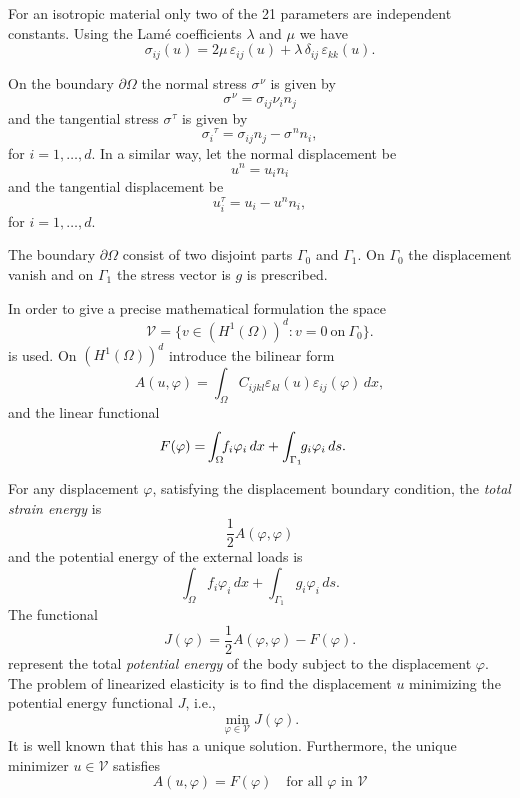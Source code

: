 \documentclass[12pt,a4paper]{article}
\numberwithin{equation}{section}
\numberwithin{table}{section}
\numberwithin{figure}{section}
\newcommand{\dOmega}{{\partial\Omega}}
\newcommand{\ton}{\ \text{on}\ }
\newcommand{\HenO}{H^1(\Omega)}
\newcommand{\V}{\ensuremath{\mathcal{V}}}
\newcommand{\intO}{\int_\Omega\!\!}
\newcommand{\intG}[1][0]{\int_{\Gamma_{#1}}\!\!}
\renewcommand{\epsilon}{\varepsilon}
\renewcommand{\phi}{\varphi}
\newcommand{\strain}[1][]{\ensuremath{\epsilon_{#1}}}
\newcommand{\epsij}{\strain[ij]}
\newcommand{\epskk}{\strain[kk]}
\newcommand{\epskl}{\strain[kl]}
\newcommand{\stress}[1][]{\ensuremath{\sigma_{#1}}}
\newcommand{\sigij}{\stress[ij]}
\newcommand{\dx}{{\,dx}}
\newcommand{\ds}{{\,ds}}
\begin{document}
For an isotropic material only two of the 21 parameters are independent constants.
Using the Lam\'{e} coefficients $\lambda$ and $\mu$ we have
\begin{equation}
  \label{eq:isotropStressStrain}
  \sigij(u) = 2\mu\, \epsij(u) 
  + \lambda\, \delta_{ij}\, \epskk(u).
\end{equation}

On the boundary $\dOmega$ the normal stress $\stress^\nu$ is given by
\[ \stress^\nu = \sigij \nu_in_j \]
and the tangential stress $\stress^\tau$ is given by
\[ \stress[i]^\tau = \sigij n_j - \stress^n n_i, \]
for $i=1,\ldots,d$.  In a similar way, let the normal displacement be
\[ u^n = u_i n_i \]
and the tangential displacement be
\[ u^\tau_i = u_i - u^n n_i, \]
for $i=1,\ldots,d$.

The boundary $\dOmega$ consist of two disjoint parts $\Gamma_0$ and $\Gamma_1$.  On $\Gamma_0$ the displacement vanish and on $\Gamma_1$ the stress vector is $g$ is prescribed.

In order to give a precise mathematical formulation the space
\begin{equation}
\V = \{ v\in (\HenO)^d \colon v = 0 \ton\Gamma_0\}.
\end{equation}
is used.  On $(\HenO)^d$ introduce the bilinear form
\begin{equation}
\label{eq:Aelasticity}
A(u,\phi) = \intO C_{ijkl}\epskl(u)\epsij(\phi)\dx,
\end{equation}
and the linear functional
\begin{align}
\label{eq:Felasticity}
F(\phi) = & \intO f_i\phi_i\dx
        + \intG[1] g_i \phi_i\ds. \notag
\end{align}

For any displacement $\phi$, satisfying the displacement boundary
condition, the \emph{total strain energy} is
\begin{equation}
  \label{eq:strainEnergy}
  \frac{1}{2}A(\phi,\phi)
\end{equation}
and the potential energy of the external loads is
\begin{equation}
  \label{eq:potentialEnergyLoads}
  \intO f_i\phi_i\dx +
  \intG[1] g_i \phi_i\ds.
\end{equation}
The functional
\begin{equation}
        J(\phi) = \frac{1}{2}A(\phi,\phi) - F(\phi).
\end{equation}
represent the total \emph{potential energy} of the body subject to the
displacement $\phi$.  The problem of linearized elasticity is to find
the displacement $u$ minimizing the potential energy functional $J$,
i.e.,
\begin{equation}
  \label{eq:UnconstrainedMin}
  \min_{\phi\in\V} J(\phi).
\end{equation}
It is well known that this has a unique solution. Furthermore, the unique minimizer $u\in\V$ satisfies
\begin{equation}
  A(u, \phi) = F(\phi)\quad\text{for all $\phi$ in $\V$}
\end{equation}
\end{document}
